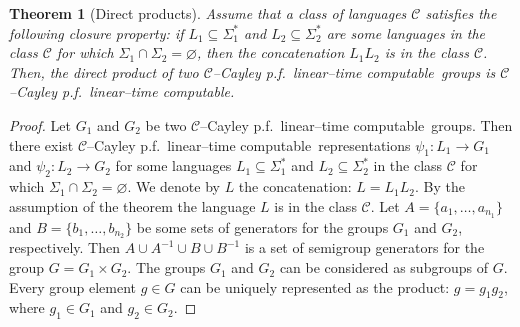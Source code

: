 \documentclass[article,12pt]{elsarticle}
\newtheorem{theorem}{Theorem}
\newcommand\ClinearC{$\mathcal{C}$--Cayley p.f.~linear--time computable}
\begin{document}
\begin{theorem}[Direct products]
	\label{directproducttheorem}	
	Assume that a class of languages $\mathcal{C}$ 
	satisfies the following closure property: 
	if $L_1 \subseteq \Sigma_1 ^*$ 
	and $L_2 \subseteq \Sigma_2 ^*$
	are some languages in the class  
	$\mathcal{C}$ for which 
	$\Sigma_1 \cap \Sigma_2 = \varnothing$, 
	then the concatenation $L_1 L_2$ is in 
	the class $\mathcal{C}$.  
	Then, the direct product of two 
	\ClinearC\ groups 
	is \ClinearC. 
\end{theorem}
\begin{proof}
	Let $G_1$ and $G_2$ be two 
	\ClinearC\ 
	groups. Then there exist 
	\ClinearC\  
	representations $\psi_1 : L_1 \rightarrow G_1$ 
	and $\psi_2 : L_2 \rightarrow G_2$ for some 
	languages 
	$L_1 \subseteq \Sigma_1 ^*$ and 
	$L_2 \subseteq \Sigma_2 ^*$ in the 
	class $\mathcal{C}$ for which 
	$\Sigma_1 \cap \Sigma_2 = \varnothing$.     
	We denote by $L$ the concatenation: 
	$L = L_1 L_2$. By the assumption of the 
	theorem the language $L$ is in the class 
	$\mathcal{C}$. Let $A = \{a_1,\dots,a_{n_1}\}$ 
	and $B = \{b_1,\dots,b_{n_2}\}$ be some sets
	of generators for the groups $G_1$ and $G_2$, respectively.  
	Then $A \cup A^{-1} \cup B \cup B^{-1}$ is a set of 
	semigroup generators for the group 
	$G = G_1 \times G_2$. 
	The groups $G_1$ and $G_2$ can be considered  
	as subgroups of $G$. Every group
	element $g \in G$ can be uniquely 
	represented as the product: $g= g_1 g_2$, 
	where $g_1 \in G_1$ and $g_2 \in G_2$.        
	

\end{proof}
\end{document}
